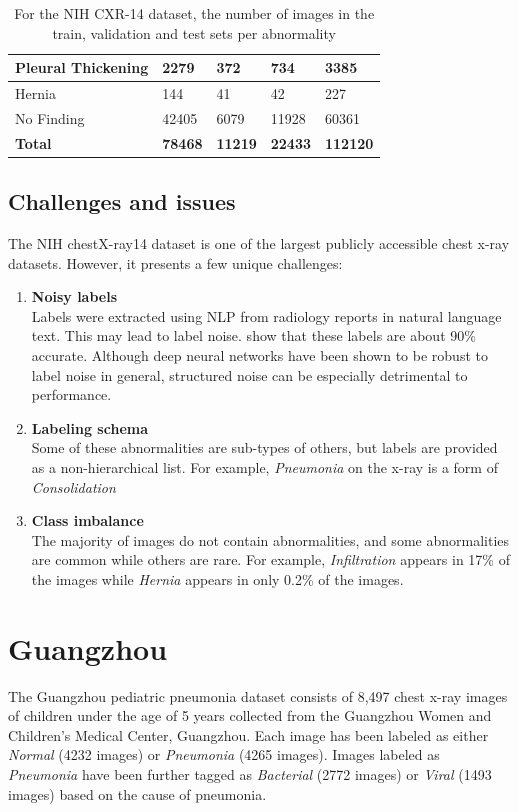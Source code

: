 \documentclass[12pt,oneside,a4paper]{report}
\begin{document}
\begin{table}[]
\begin{tabular}{@{}lllll@{}}
    Pleural Thickening   & 2279      & 372        & 734       & 3385            \\ \midrule
    Hernia               & 144       & 41         & 42        & 227             \\ \midrule
    No Finding           & 42405     & 6079       & 11928     & 60361           \\ \midrule
    \textbf{Total}       & \textbf{78468} & \textbf{11219}  & \textbf{22433} & \textbf{112120} \\ \bottomrule
  \end{tabular}
  \caption{For the NIH CXR-14 dataset, the number of images in the train,
    validation and test sets per abnormality}
  \label{tab:nih_split}
\end{table}

\subsection{Challenges and issues}
The NIH chestX-ray14 dataset is one of the largest publicly accessible chest
x-ray datasets. However, it presents a few unique challenges:
\begin{enumerate}
\item{\textbf{Noisy labels}\\
    Labels were extracted using NLP from radiology reports in natural language
    text. This may lead to label noise. \cite{Wang2017} show that these labels
    are about 90\% accurate. Although deep neural networks have been shown to be
    robust to label noise in general\cite{rolnick2017deep}, structured noise can
    be especially detrimental to performance.}
\item{\textbf{Labeling schema}\\
    Some of these abnormalities are sub-types of others, but labels are provided
    as a non-hierarchical list. For example, \emph{Pneumonia} on the x-ray is a
    form of \emph{Consolidation} }
\item{\textbf{Class imbalance}\\
    The majority of images do not contain abnormalities, and some abnormalities
    are common while others are rare. For example, \emph{Infiltration} appears
    in 17\% of the images while \emph{Hernia} appears in only 0.2\% of the images.}
\end{enumerate}

\section{Guangzhou\label{mendeley}}
The Guangzhou pediatric pneumonia dataset consists of 8,497 chest x-ray images
of children under the age of 5 years collected from the Guangzhou Women and
Children’s Medical Center, Guangzhou. Each image has been labeled as either
\emph{Normal} (4232 images) or \emph{Pneumonia} (4265 images). Images labeled as
\emph{Pneumonia} have been further tagged as \emph{Bacterial} (2772
images) or \emph{Viral} (1493 images) based on the cause of pneumonia.\\
\end{document}
